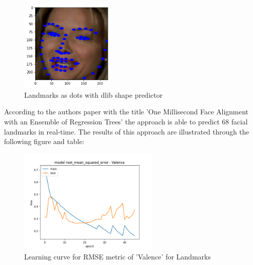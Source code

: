 \begin{figure}[H]
  \begin{center}
  \includegraphics[angle=0, width=0.4\textwidth]{Figures/landmarks_as_dots.png}
  \caption{Landmarks as dots with dlib shape predictor}
  \label{fig:LandmarkdsDots}
  \end{center}
\end{figure}

According to the authors paper with the title 'One Millisecond Face Alignment with an Ensemble of Regression Trees' \citep{Kazemi:2014:ShapePredictor} the approach is able to predict 68 facial landmarks in real-time. The results of this approach are illustrated through the following figure and table:

\begin{figure}[H]
  \begin{center}
  \includegraphics[angle=0, width=0.6\textwidth]{Figures/rmse_out1_landmarks.png}
  \caption{Learning curve for RMSE metric of 'Valence' for Landmarks}
  \label{fig:ASM}
  \end{center}
\end{figure}

